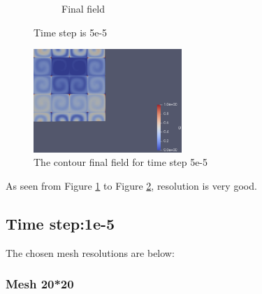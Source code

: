 \documentclass{article}
\begin{document}
\begin{figure}[hbt!]
\begin{subfigure}{0.4\textwidth}
        \caption{Final field}
  \end{subfigure}
  \caption{Time step is 5e-5}
  \label{t2m6_1} 
\end{figure}

\begin{figure}[hbt!]
    \centering
    \includegraphics[width=0.5\textwidth]{Figures/5e-5 400x400/contour.png}
    \caption{The contour final field for time step 5e-5}
    \label{t2m6_2} 
\end{figure}

As seen from Figure \ref{t2m6_1} to Figure \ref{t2m6_2}, resolution is very good.


\clearpage
\subsection{Time step:1e-5}

The chosen mesh resolutions are below: 

\subsubsection{Mesh 20*20}
\end{document}
